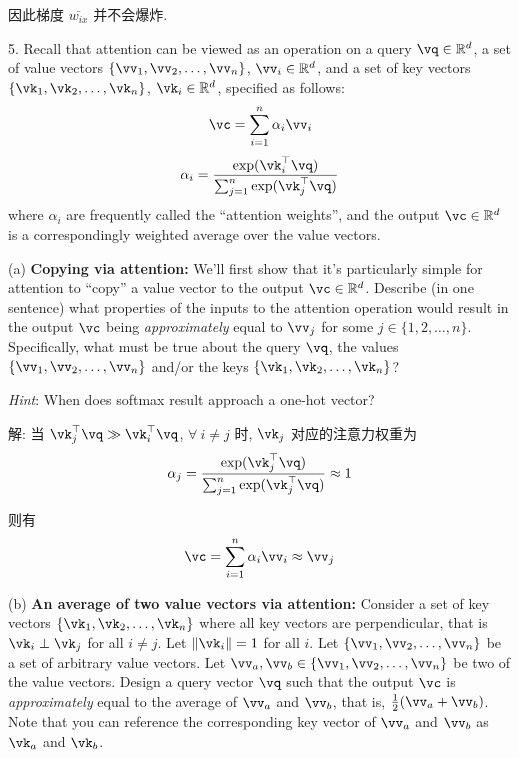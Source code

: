 \documentclass[openany]{ctexbook}
\theoremstyle{kaiti}
\theoremstyle{normal}
\begin{document}
因此梯度 $\overline{w_{ix}}$ 并不会爆炸.

5. Recall that attention can be viewed as an operation on a query $\vq\in\mathbb{R}^{d}$, a set of value vectors $\{\vv_{1},\vv_2, \dots, \vv_{n}\}$, $\vv_{i} \in \mathbb{R}^{d}$, and a set of key vectors $\{\vk_{1},\vk_2,\dots, \vk_{n}\}$, $\vk_{i} \in \mathbb{R}^{d}$, specified as follows:
\begin{equation}
   \vc=\sum_{i=1}^{n} \alpha_{i}\vv_{i} 
\end{equation} 
\begin{equation}
  \alpha_{i}
  =\frac{\exp(\vk_{i}^{\top}\vq)}{\sum_{j=1}^{n}\exp(\vk_{j}^{\top}\vq)}
\end{equation}
where $\alpha_i$ are frequently called the ``attention weights'', and the output $\vc \in \mathbb{R}^{d}$ is a correspondingly weighted average over the value vectors.

(a) \textbf{Copying via attention:} We'll first show that it's particularly simple for attention to ``copy'' a value vector to the output $\vc\in\mathbb{R}^{d} $. Describe (in one sentence) what properties of the inputs to the attention operation would result in the output $\vc$ being \emph{approximately} equal to $\vv_j$ for some $j \in\{1,2, \dots, n\}$. Specifically, what must be true about the query $\vq$, the values $\{\vv_{1},\vv_2, \dots, \vv_{n}\}$ and/or the keys $\{\vk_{1},\vk_2,\dots, \vk_{n}\}$?

\emph{Hint}: When does softmax result approach a one-hot vector?

解: 当 $\vk_j^\top\vq\gg\vk_i^\top\vq$, $\forall~i\neq j$ 时, $\vk_j$ 对应的注意力权重为
\begin{equation}
  \alpha_j
  =\frac{\exp(\vk_{j}^{\top}\vq)}{\sum_{j=1}^{n}\exp(\vk_{j}^{\top}\vq)}
  \approx1
\end{equation} 

则有
\begin{equation}
  \vc
  =\sum_{i=1}^{n}\alpha_{i}\vv_{i}
  \approx\vv_j
\end{equation}

(b) \textbf{An average of two value vectors via attention:} Consider a set of key vectors $\{\vk_{1},\vk_2,\dots, \vk_{n}\}$ where all key vectors are perpendicular, that is $\vk_{i} \perp \vk_{j}$ for all  $i \neq j$. Let $\|\vk_{i}\|=1$ for all $i$. Let $\{\vv_{1},\vv_2, \dots, \vv_{n}\}$  be a set of arbitrary value vectors. Let $\vv_a, \vv_b \in \{\vv_{1},\vv_2, \dots, \vv_{n}\}$ be two of the value vectors. Design a query vector $\vq$ such that the output $\vc$ is \emph{approximately} equal to the average of $\vv_a$ and $\vv_b$, that is, $\frac{1}{2}(\vv_{a}+\vv_{b})$. Note that you can reference the corresponding key vector of $\vv_a$ and $\vv_b$ as $\vk_a$ and $\vk_b$.
\end{document}
